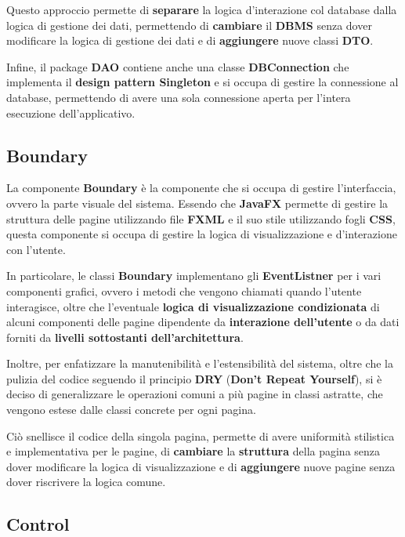 Questo approccio permette di \textbf{separare} la logica d'interazione col database dalla
logica di gestione dei dati, permettendo di \textbf{cambiare} il \textbf{DBMS} senza dover
modificare la logica di gestione dei dati e di \textbf{aggiungere} nuove classi \textbf{DTO}.

Infine, il package \textbf{DAO} contiene anche una classe \textbf{DBConnection} che
implementa il \textbf{design pattern Singleton} e si occupa di gestire la connessione
al database, permettendo di avere una sola connessione aperta per l'intera esecuzione
dell'applicativo.


\subsection{Boundary}

La componente \textbf{Boundary} è la componente che si occupa di gestire l'interfaccia,
ovvero la parte visuale del sistema. Essendo che \textbf{JavaFX} permette di gestire
la struttura delle pagine utilizzando file \textbf{FXML} e il suo stile utilizzando fogli
\textbf{CSS}, questa componente si occupa di gestire la logica di visualizzazione
 e d'interazione con l'utente.

In particolare, le classi \textbf{Boundary} implementano gli \textbf{EventListner} per i vari
componenti grafici, ovvero i metodi che vengono chiamati quando l'utente interagisce, 
oltre che l'eventuale \textbf{logica di visualizzazione condizionata} di alcuni componenti 
delle pagine dipendente da \textbf{interazione dell'utente} o da dati forniti da 
\textbf{livelli sottostanti dell'architettura}.

Inoltre, per enfatizzare la manutenibilità e l'estensibilità del sistema, oltre che la pulizia
del codice seguendo il principio \textbf{DRY} (\textbf{Don't Repeat Yourself}), si è 
deciso di generalizzare le operazioni comuni a più pagine in classi astratte, che
vengono estese dalle classi concrete per ogni pagina.

Ciò snellisce il codice della singola pagina, permette di avere uniformità stilistica 
e implementativa per le pagine, di \textbf{cambiare} la \textbf{struttura}
della pagina senza dover modificare la logica di visualizzazione e di \textbf{aggiungere} nuove
pagine senza dover riscrivere la logica comune.


\subsection{Control}

